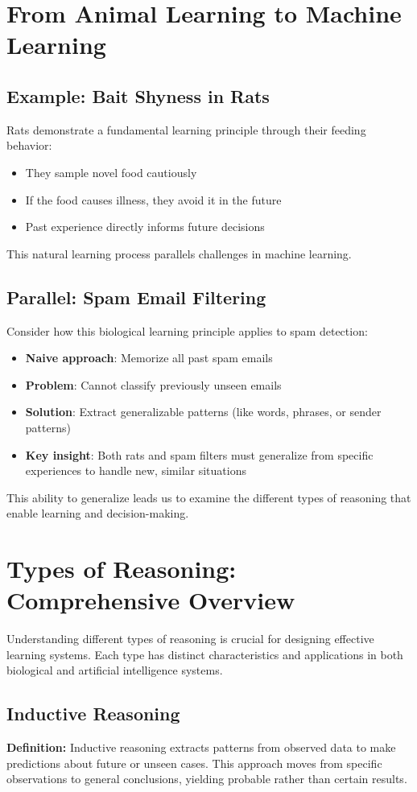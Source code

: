 \section{From Animal Learning to Machine Learning}
\subsection{Example: Bait Shyness in Rats}
Rats demonstrate a fundamental learning principle through their feeding behavior:
\begin{itemize}
    \item They sample novel food cautiously
    \item If the food causes illness, they avoid it in the future
    \item Past experience directly informs future decisions
\end{itemize}
This natural learning process parallels challenges in machine learning.

\subsection{Parallel: Spam Email Filtering}
Consider how this biological learning principle applies to spam detection:
\begin{itemize}
    \item \textbf{Naive approach}: Memorize all past spam emails
    \item \textbf{Problem}: Cannot classify previously unseen emails
    \item \textbf{Solution}: Extract generalizable patterns (like words, phrases, or sender patterns)
    \item \textbf{Key insight}: Both rats and spam filters must generalize from specific experiences to handle new, similar situations
\end{itemize}
This ability to generalize leads us to examine the different types of reasoning that enable learning and decision-making.

\section{Types of Reasoning: Comprehensive Overview}
Understanding different types of reasoning is crucial for designing effective learning systems. Each type has distinct characteristics and applications in both biological and artificial intelligence systems.

\subsection{Inductive Reasoning}
\textbf{Definition:} Inductive reasoning extracts patterns from observed data to make predictions about future or unseen cases. This approach moves from specific observations to general conclusions, yielding probable rather than certain results.

